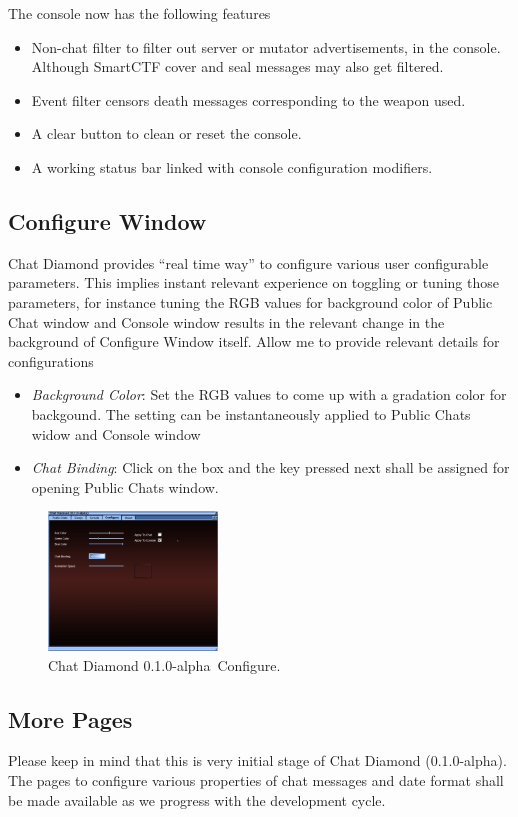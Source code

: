 \documentclass{article}
\theoremstyle{definition}
\newcommand{\ChatDiamondVersion}{0.1.0-alpha}
\begin{document}
The console now has the following features
\begin{itemize}
\item Non-chat filter to filter out server or mutator advertisements, in the console. Although SmartCTF cover and seal messages may also get filtered.
\item Event filter censors death messages corresponding to the weapon used.
\item A clear button to clean or reset the console.
\item A working status bar linked with console configuration modifiers.
\end{itemize}

\subsection{Configure Window}
Chat Diamond provides ``real time way'' to configure various user configurable parameters.  This implies instant relevant experience on toggling or tuning those parameters, for instance 
tuning the RGB values  for background color of Public Chat window and Console window results in the relevant change in the background of Configure Window itself.   Allow me to provide 
relevant details for configurations
\begin{itemize}
\item \emph{Background Color}: Set the RGB values to come up with a gradation color for backgound.  The setting can be instantaneously applied to Public Chats widow and Console window
\item \emph{Chat Binding}: Click on the box and the key pressed next shall be assigned for opening Public Chats window.
\end{itemize}

\begin{figure}
\centering
\includegraphics[width=0.4\textwidth]{img_configure}
\caption{Chat Diamond \ChatDiamondVersion~Configure.}
\label{fig:chatdiamond_configure}
\end{figure}


\subsection{More Pages}
Please keep in mind that this is very initial stage of Chat Diamond (\ChatDiamondVersion).  The pages to configure various properties of chat messages
and date format shall be made available as we progress with the development cycle.
\end{document}
